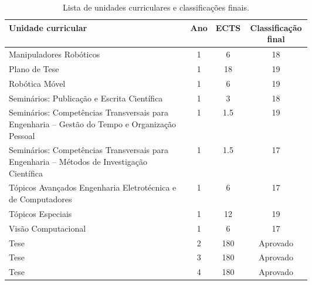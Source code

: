 \documentclass[11pt,a4paper,oneside]{article}
\begin{document}
\begin{table}[ht]
\centering
\caption{Lista de unidades curriculares e classificações finais.}
\label{tab:ucs}
\begin{tabular}{@{} p{0.6\linewidth} ccc@{}}
\toprule
\textbf{Unidade curricular} & \textbf{Ano} & \textbf{ECTS} & \textbf{Classificação final} \\
\midrule
Manipuladores Robóticos                                                                        & 1 &   6   & 18 \\
Plano de Tese                                                                                  & 1 &  18   & 19 \\
Robótica Móvel                                                                                 & 1 &   6   & 19 \\
Seminários: Publicação e Escrita Científica                                                    & 1 &   3   & 18 \\
Seminários: Competências Transversais para Engenharia -- Gestão do Tempo e Organização Pessoal & 1 &   1.5 & 19 \\
Seminários: Competências Transversais para Engenharia -- Métodos de Investigação Científica    & 1 &   1.5 & 17 \\
Tópicos Avançados Engenharia Eletrotécnica e de Computadores                                   & 1 &   6   & 17 \\
Tópicos Especiais                                                                              & 1 &  12   & 19 \\
Visão Computacional                                                                            & 1 &   6   & 17 \\
Tese                                                                                           & 2 & 180   & Aprovado \\
Tese                                                                                           & 3 & 180   & Aprovado \\
Tese                                                                                           & 4 & 180   & Aprovado \\
\bottomrule
\end{tabular}
\end{table}
\end{document}
